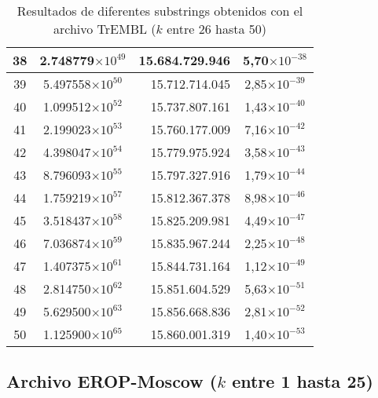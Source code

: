 \begin{table}[!hbt]
\begin{tabular}{| c  r  r  c |}
   38 & \multicolumn{1}{c}{2.748779$\times 10^{49}$} & 15.684.729.946 & 5,70$\times 10^{-38}$\\ \hline
   39 & \multicolumn{1}{c}{5.497558$\times 10^{50}$} & 15.712.714.045 & 2,85$\times 10^{-39}$\\ \hline
   40 & \multicolumn{1}{c}{1.099512$\times 10^{52}$} & 15.737.807.161 & 1,43$\times 10^{-40}$\\ \hline
   41 & \multicolumn{1}{c}{2.199023$\times 10^{53}$} & 15.760.177.009 & 7,16$\times 10^{-42}$\\ \hline
   42 & \multicolumn{1}{c}{4.398047$\times 10^{54}$} & 15.779.975.924 & 3,58$\times 10^{-43}$\\ \hline
   43 & \multicolumn{1}{c}{8.796093$\times 10^{55}$} & 15.797.327.916 & 1,79$\times 10^{-44}$\\ \hline
   44 & \multicolumn{1}{c}{1.759219$\times 10^{57}$} & 15.812.367.378 & 8,98$\times 10^{-46}$\\ \hline
   45 & \multicolumn{1}{c}{3.518437$\times 10^{58}$} & 15.825.209.981 & 4,49$\times 10^{-47}$\\ \hline
   46 & \multicolumn{1}{c}{7.036874$\times 10^{59}$} & 15.835.967.244 & 2,25$\times 10^{-48}$\\ \hline
   47 & \multicolumn{1}{c}{1.407375$\times 10^{61}$} & 15.844.731.164 & 1,12$\times 10^{-49}$\\ \hline
   48 & \multicolumn{1}{c}{2.814750$\times 10^{62}$} & 15.851.604.529 & 5,63$\times 10^{-51}$\\ \hline
   49 & \multicolumn{1}{c}{5.629500$\times 10^{63}$} & 15.856.668.836 & 2,81$\times 10^{-52}$\\ \hline
   50 & \multicolumn{1}{c}{1.125900$\times 10^{65}$} & 15.860.001.319 & 1,40$\times 10^{-53}$\\ \hline
   \end{tabular}
   \caption{Resultados de diferentes substrings obtenidos con el archivo TrEMBL ($k$ entre 26 hasta 50)}
   \label{tb:labela22}
\end{table}

\newpage

\subsection*{Archivo EROP-Moscow ($k$ entre 1 hasta 25)}

